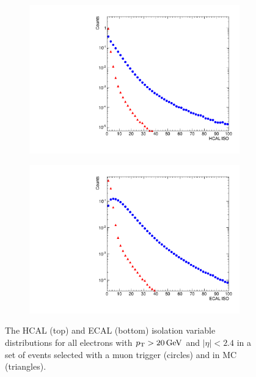 \begin{figure}[!htbp]
    \centering
    \begin{subfigure}[b]{0.65\textwidth}
        \includegraphics[width=\textwidth]{figures/hcal_iso.pdf}
        \caption{}
        \label{fig:hcal_iso}
    \end{subfigure}
    \begin{subfigure}[b]{0.65\textwidth}
        \includegraphics[width=\textwidth]{figures/ecal_iso.pdf}
        \caption{}
        \label{fig:ecal_iso}
    \end{subfigure}
    \caption{
        The HCAL (top) and ECAL (bottom) isolation variable distributions for
        all electrons with $p_{\mathrm{T}} > 20 \,\text{Ge\hspace{-.08em}V}$ and $|\eta| < 2.4$ in a set of
        events selected with a muon trigger (circles) and in \MADGRAPH \Ztoee
        MC (triangles).
    }
    \label{fig:hcal_ecal_isos}
\end{figure}

